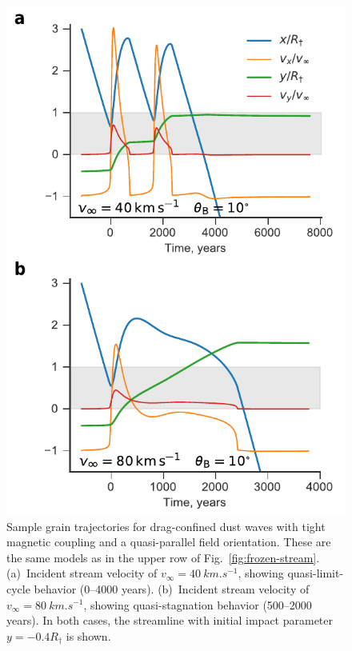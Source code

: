 \begin{figure}
  \centering
  \includegraphics[width=\linewidth]{figs/frozen-trajectories-multi}
  \caption{Sample grain trajectories for drag-confined dust waves with
    tight magnetic coupling and a quasi-parallel field
    orientation. These are the same models as in the upper row of
    Fig.~\ref{fig:frozen-stream}. (a)~Incident stream velocity of
    \(v_\infty = \SI{40}{km.s^{-1}}\), showing quasi-limit-cycle behavior
    (\numrange{0}{4000} years).  (b)~Incident stream velocity of
    \(v_\infty = \SI{80}{km.s^{-1}}\), showing quasi-stagnation behavior
    (\numrange{500}{2000} years).  In both cases, the streamline with
    initial impact parameter \(y = -0.4 R_\dag\) is shown.}
  \label{fig:frozen-trajectories}
\end{figure}

